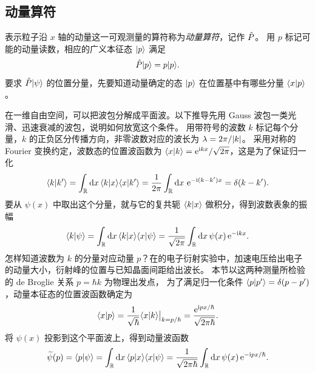 \subsection{动量算符}
\label{ss:momentum-position}
表示粒子沿 $x$ 轴的动量这一可观测量的算符称为\emph{动量算符}，记作 $\hat{P}$。
用 $p$ 标记可能的动量读数，相应的广义本征态 $\lvert p\rangle$ 满足
\begin{equation}
    \hat{P}\lvert p\rangle = p\lvert p\rangle.
\end{equation}
要求 $\hat{P}\lvert\psi\rangle$ 的位置分量，先要知道动量确定的态 $\lvert p\rangle$ 在位置基中有哪些分量 $\langle x\vert p\rangle$。

在一维自由空间，可以把波包分解成平面波。以下推导先用 Gauss 波包一类光滑、迅速衰减的波包，说明如何放宽这个条件。
用带符号的波数 $k$ 标记每个分量，$k$ 的正负区分传播方向，非零波数对应的波长为 $\lambda = 2\pi/\lvert k\rvert$。
采用对称的 Fourier 变换约定，波数态的位置波函数为 $\langle x\vert k\rangle = \mathop{}\!\mathrm{e}^{\mathrm{i} kx}/\sqrt{2\pi}$，这是为了保证归一化
\begin{equation}
    \langle k\vert k'\rangle = \int_{\mathbb{R}}\mathop{}\!\mathrm{d} x\,\langle k\vert x\rangle\langle x\vert k'\rangle
    = \frac{1}{2\pi}\int_{\mathbb{R}}\mathop{}\!\mathrm{d} x\,\mathop{}\!\mathrm{e}^{-\mathrm{i} (k-k')x}
    = \delta(k - k').
\end{equation}
要从 $\psi(x)$ 中取出这个分量，就与它的复共轭 $\langle k\vert x\rangle$ 做积分，得到波数表象的振幅
\begin{equation}
    \langle k\vert\psi\rangle = \int_{\mathbb{R}}\mathop{}\!\mathrm{d} x\,\langle k\vert x\rangle\langle x\vert\psi\rangle = \frac{1}{\sqrt{2\pi}}\int_{\mathbb{R}}\mathop{}\!\mathrm{d} x\,\psi(x)\mathop{}\!\mathrm{e}^{-\mathrm{i} kx}.
\end{equation}
怎样知道波数为 $k$ 的分量对应动量 $p$？在的电子衍射实验中，加速电压给出电子的动量大小，衍射峰的位置与已知晶面间距给出波长。
本节以这两种测量所检验的 de Broglie 关系 $p = \hbar k$ 为物理出发点，
为了满足归一化条件 $\langle p\vert p'\rangle = \delta(p - p')$，动量本征态的位置波函数确定为
\begin{equation}
    \langle x\vert p\rangle = \frac{1}{\sqrt{\hbar}}{\langle x\vert k\rangle}\bigr\rvert_{k=p/\hbar}
    = \frac{\mathop{}\!\mathrm{e}^{\mathrm{i} px/\hbar}}{\sqrt{2\pi\hbar}}.
\end{equation}
将 $\psi(x)$ 投影到这个平面波上，得到动量波函数
\begin{equation}
    \widetilde\psi(p) = \langle p\vert\psi\rangle
    = \int_{\mathbb{R}}\mathop{}\!\mathrm{d} x\,\langle p\vert x\rangle\langle x\vert\psi\rangle
    = \frac{1}{\sqrt{2\pi\hbar}}\int_{\mathbb{R}}\mathop{}\!\mathrm{d} x\,\psi(x)\mathop{}\!\mathrm{e}^{-\mathrm{i} px/\hbar}.
\end{equation}

